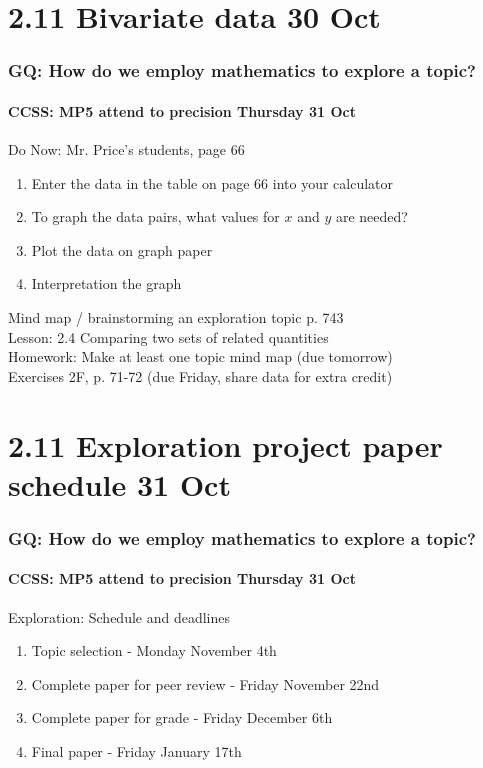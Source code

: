 \documentclass{beamer}
\begin{document}
  \section{2.11 Bivariate data 30 Oct}
  \frame
  {
    \frametitle{GQ: How do we employ mathematics to explore a topic?}
    \framesubtitle{CCSS: MP5 attend to precision \hfill \alert{Thursday 31 Oct}}

    \begin{block}{Do Now: Mr. Price's students, page 66}
    \begin{enumerate}
        \item Enter the data in the table on page 66 into your calculator
        \item To graph the data pairs, what values for $x$ and $y$ are needed?
        \item Plot the data on graph paper 
        \item Interpretation the graph
    \end{enumerate}
    \end{block}
    Mind map / brainstorming an exploration topic p. 743 \\
    Lesson: 2.4 Comparing two sets of related quantities\\ \smallskip
    Homework: Make at least one topic mind map (due tomorrow)\\
    Exercises 2F, p. 71-72 (due Friday, share data for extra credit)
  }

  \section{2.11 Exploration project paper schedule 31 Oct}
  \frame
  {
    \frametitle{GQ: How do we employ mathematics to explore a topic?}
    \framesubtitle{CCSS: MP5 attend to precision \hfill \alert{Thursday 31 Oct}}
    \begin{block}{Exploration: Schedule and deadlines}
      \begin{enumerate}
        \item Topic selection - Monday November 4th
        \item Complete paper for peer review - Friday November 22nd
        \item Complete paper for grade - Friday December 6th
        \item Final paper - Friday January 17th
      \end{enumerate}
      \end{block}
}
\end{document}
